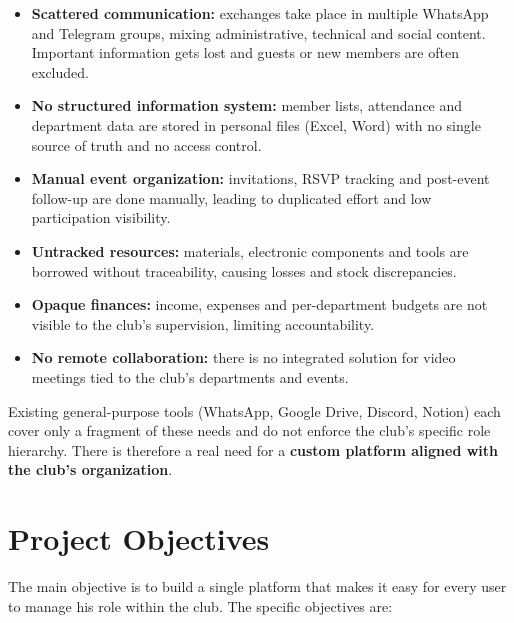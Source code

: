 \documentclass[12pt,a4paper]{report}
\begin{document}
\begin{itemize}[leftmargin=*]
    \item \textbf{Scattered communication:} exchanges take place in multiple WhatsApp and
          Telegram groups, mixing administrative, technical and social content. Important
          information gets lost and guests or new members are often excluded.
    \item \textbf{No structured information system:} member lists, attendance and
          department data are stored in personal files (Excel, Word) with no single source
          of truth and no access control.
    \item \textbf{Manual event organization:} invitations, RSVP tracking and post-event
          follow-up are done manually, leading to duplicated effort and low participation
          visibility.
    \item \textbf{Untracked resources:} materials, electronic components and tools are
          borrowed without traceability, causing losses and stock discrepancies.
    \item \textbf{Opaque finances:} income, expenses and per-department budgets are not
          visible to the club's supervision, limiting accountability.
    \item \textbf{No remote collaboration:} there is no integrated solution for video
          meetings tied to the club's departments and events.
\end{itemize}

Existing general-purpose tools (WhatsApp, Google Drive, Discord, Notion) each cover only a
fragment of these needs and do not enforce the club's specific role hierarchy. There is
therefore a real need for a \textbf{custom platform aligned with the club's organization}.

\section{Project Objectives}

The main objective is to build a single platform that makes it easy for every user to
manage his role within the club. The specific objectives are:
\end{document}
